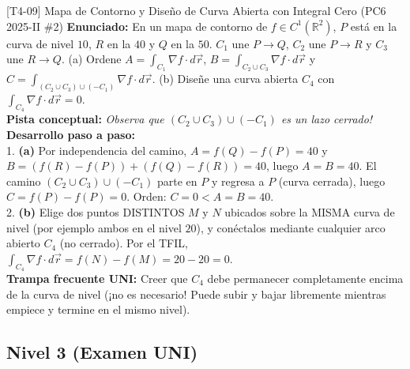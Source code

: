\documentclass[11pt,a4paper]{article}
\begin{document}
\begin{ejerciciobox}{[T4-09] Mapa de Contorno y Diseño de Curva Abierta con Integral Cero (PC6 2025-II \#2)}
\textbf{Enunciado:} En un mapa de contorno de $f \in C^1(\mathbb{R}^2)$, $P$ está en la curva de nivel $10$, $R$ en la $40$ y $Q$ en la $50$. $C_1$ une $P\to Q$, $C_2$ une $P\to R$ y $C_3$ une $R\to Q$. (a) Ordene $A=\int_{C_1}\nabla f\cdot d\vec{r}$, $B=\int_{C_2\cup C_3}\nabla f\cdot d\vec{r}$ y $C=\int_{(C_2\cup C_3)\cup(-C_1)}\nabla f\cdot d\vec{r}$. (b) Diseñe una curva abierta $C_4$ con $\int_{C_4}\nabla f\cdot d\vec{r}=0$.\\[0.2cm]
\textbf{Pista conceptual:} \emph{Observa que $(C_2\cup C_3)\cup(-C_1)$ es un lazo cerrado!}\\[0.2cm]
\textbf{Desarrollo paso a paso:}\\
1. \textbf{(a)} Por independencia del camino, $A = f(Q)-f(P) = 40$ y $B = (f(R)-f(P)) + (f(Q)-f(R)) = 40$, luego $A = B = 40$. El camino $(C_2\cup C_3)\cup(-C_1)$ parte en $P$ y regresa a $P$ (curva cerrada), luego $C = f(P)-f(P) = 0$. Orden: $C = 0 < A = B = 40$.\\
2. \textbf{(b)} Elige dos puntos DISTINTOS $M$ y $N$ ubicados sobre la MISMA curva de nivel (por ejemplo ambos en el nivel $20$), y conéctalos mediante cualquier arco abierto $C_4$ (no cerrado). Por el TFIL, $\int_{C_4} \nabla f\cdot d\vec{r} = f(N) - f(M) = 20 - 20 = 0$.\\[0.2cm]
\textbf{Trampa frecuente UNI:} Creer que $C_4$ debe permanecer completamente encima de la curva de nivel (¡no es necesario! Puede subir y bajar libremente mientras empiece y termine en el mismo nivel).
\end{ejerciciobox}

\subsection{Nivel 3 (Examen UNI)}
\end{document}
